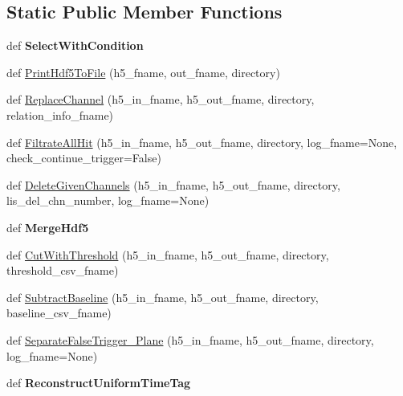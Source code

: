 \subsection*{Static Public Member Functions}
\begin{DoxyCompactItemize}
\item 
\mbox{\label{classMIS_1_1DataAnalysisTools_1_1DataframeProcessor_1_1DataframeProcessor_a00f047bf8712fee996476acac7d5c5aa}} 
def {\bfseries Select\+With\+Condition}
\item 
def \hyperlink{classMIS_1_1DataAnalysisTools_1_1DataframeProcessor_1_1DataframeProcessor_ad31a267c72dbc35025fccd1c0314a997}{Print\+Hdf5\+To\+File} (h5\+\_\+fname, out\+\_\+fname, directory)
\item 
def \hyperlink{classMIS_1_1DataAnalysisTools_1_1DataframeProcessor_1_1DataframeProcessor_ac1fc6777aaf687e33defcbe7babbc5d3}{Replace\+Channel} (h5\+\_\+in\+\_\+fname, h5\+\_\+out\+\_\+fname, directory, relation\+\_\+info\+\_\+fname)
\item 
def \hyperlink{classMIS_1_1DataAnalysisTools_1_1DataframeProcessor_1_1DataframeProcessor_a3d6b29a9d726bce95ff788e78e6727a4}{Filtrate\+All\+Hit} (h5\+\_\+in\+\_\+fname, h5\+\_\+out\+\_\+fname, directory, log\+\_\+fname=None, check\+\_\+continue\+\_\+trigger=False)
\item 
def \hyperlink{classMIS_1_1DataAnalysisTools_1_1DataframeProcessor_1_1DataframeProcessor_a9ffa2dca6e4987e3d2081429ad33edaa}{Delete\+Given\+Channels} (h5\+\_\+in\+\_\+fname, h5\+\_\+out\+\_\+fname, directory, lis\+\_\+del\+\_\+chn\+\_\+number, log\+\_\+fname=None)
\item 
\mbox{\label{classMIS_1_1DataAnalysisTools_1_1DataframeProcessor_1_1DataframeProcessor_ab30f43e77508681fe94212f001036f18}} 
def {\bfseries Merge\+Hdf5}
\item 
def \hyperlink{classMIS_1_1DataAnalysisTools_1_1DataframeProcessor_1_1DataframeProcessor_abd381270c44ab9051187719dbe9776c3}{Cut\+With\+Threshold} (h5\+\_\+in\+\_\+fname, h5\+\_\+out\+\_\+fname, directory, threshold\+\_\+csv\+\_\+fname)
\item 
def \hyperlink{classMIS_1_1DataAnalysisTools_1_1DataframeProcessor_1_1DataframeProcessor_a23c1697cec9f125c598fab306c910924}{Subtract\+Baseline} (h5\+\_\+in\+\_\+fname, h5\+\_\+out\+\_\+fname, directory, baseline\+\_\+csv\+\_\+fname)
\item 
def \hyperlink{classMIS_1_1DataAnalysisTools_1_1DataframeProcessor_1_1DataframeProcessor_ab06da07b7835bf03d276ab8b2c457df0}{Separate\+False\+Trigger\+\_\+\+Plane} (h5\+\_\+in\+\_\+fname, h5\+\_\+out\+\_\+fname, directory, log\+\_\+fname=None)
\item 
\mbox{\label{classMIS_1_1DataAnalysisTools_1_1DataframeProcessor_1_1DataframeProcessor_a730d9f5d54f0e4611063f9205feb7e76}} 
def {\bfseries Reconstruct\+Uniform\+Time\+Tag}
\end{DoxyCompactItemize}


